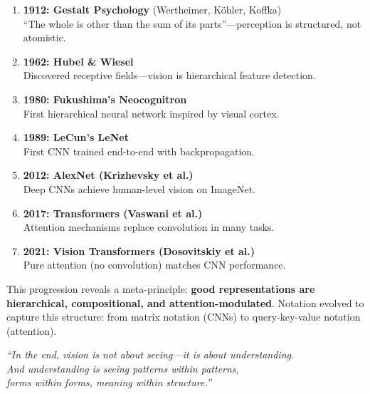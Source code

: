 \begin{enumerate}
	\item \textbf{1912: Gestalt Psychology} (Wertheimer, Köhler, Koffka)\\
	``The whole is other than the sum of its parts''---perception is structured, not atomistic.
	
	\item \textbf{1962: Hubel \& Wiesel}\\
	Discovered receptive fields---vision is hierarchical feature detection.
	
	\item \textbf{1980: Fukushima's Neocognitron}\\
	First hierarchical neural network inspired by visual cortex.
	
	\item \textbf{1989: LeCun's LeNet}\\
	First CNN trained end-to-end with backpropagation.
	
	\item \textbf{2012: AlexNet (Krizhevsky et al.)}\\
	Deep CNNs achieve human-level vision on ImageNet.
	
	\item \textbf{2017: Transformers (Vaswani et al.)}\\
	Attention mechanisms replace convolution in many tasks.
	
	\item \textbf{2021: Vision Transformers (Dosovitskiy et al.)}\\
	Pure attention (no convolution) matches CNN performance.
\end{enumerate}

This progression reveals a meta-principle: \textbf{good representations are hierarchical, compositional, and attention-modulated}. Notation evolved to capture this structure: from matrix notation (CNNs) to query-key-value notation (attention).

\vspace{1cm}

\begin{center}
	\itshape
	``In the end, vision is not about seeing—it is about understanding. \\
	And understanding is seeing patterns within patterns, \\
	forms within forms, meaning within structure.''
\end{center}

\clearpage
